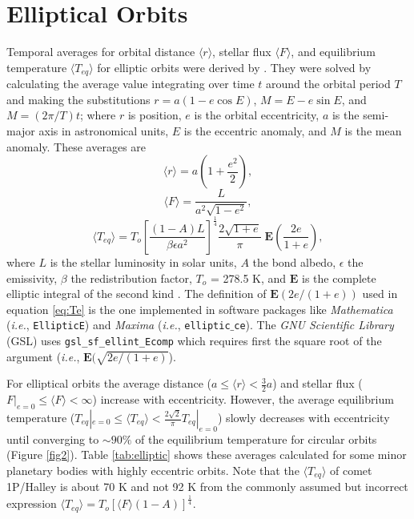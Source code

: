 \documentclass[a4paper,fleqn,usenatbib]{mnras}
\begin{document}
\section{Elliptical Orbits} \label{sec:elliptical}


Temporal averages for orbital distance $\langle r \rangle$, stellar flux $\langle F \rangle$, and equilibrium temperature $\langle T_{eq} \rangle$ for elliptic orbits were derived by \citet{2017ApJ...837L...1M}. They were solved by calculating the average value integrating over time $t$ around the orbital period $T$ and making the substitutions $r=a(1-e\cos{E})$, $M=E-e\sin{E}$, and $M=(2\pi/T)t$; where $r$ is position, $e$ is the orbital eccentricity, $a$ is the semi-major axis in astronomical units, $E$ is the eccentric anomaly, and $M$ is the mean anomaly. These averages are
\begin{equation} \label{eq:re}
\langle r \rangle = a\left ( 1+\frac{e^2}{2} \right ),
\end{equation}
\begin{equation} \label{eq:Fe}
\langle F \rangle = \frac{L}{a^2\sqrt{1-e^2}},
\end{equation}
\begin{equation} \label{eq:Te}
\langle T_{eq} \rangle = T_o\left[ \frac{(1-A)L}{\beta \epsilon a^2}\right] ^\frac{1}{4}\frac{2\sqrt{1+e}}{\pi} \; \mathbf{E}\left ( \frac{2e}{1+e} \right ),
\end{equation}
where $L$ is the stellar luminosity in solar units, $A$ the bond albedo, $\epsilon$ the emissivity, $\beta$ the redistribution factor, $T_o$ = 278.5 K, and $\mathbf{E}$ is the complete elliptic integral of the second kind \citep{MathWorld, GSL}. The definition of $\mathbf{E}(2e/(1+e))$ used in equation \ref{eq:Te} is the one implemented in software packages like \emph{Mathematica} (\emph{i.e.}, \texttt{EllipticE}) and \emph{Maxima} (\emph{i.e.}, \texttt{elliptic$\_$ce}). The \emph{GNU Scientific Library} (GSL) uses \texttt{gsl\_sf\_ellint\_Ecomp} which requires first the square root of the argument (\emph{i.e.}, $\mathbf{E}(\sqrt{2e/(1+e)}$).


For elliptical orbits the average distance ($a \leq \langle r \rangle < \frac{3}{2}a$) and stellar flux ($F|_{e=0} \leq \langle F \rangle < \infty$) increase with eccentricity. However, the average equilibrium temperature ($T_{eq}|_{e=0} \leq \langle T_{eq} \rangle < \frac{2\sqrt{2}}{\pi} T_{eq}|_{e=0}$) slowly decreases with eccentricity until converging to $\sim90\%$ of the equilibrium temperature for circular orbits (Figure  \ref{fig2}). Table \ref{tab:elliptic} shows these averages calculated for some minor planetary bodies with highly eccentric orbits. Note that the $\langle T_{eq} \rangle$ of comet 1P/Halley is about 70 K and not 92 K from the commonly assumed but incorrect expression $\langle T_{eq} \rangle = T_o [\langle F \rangle(1-A)]^\frac{1}{4}$.
\end{document}
